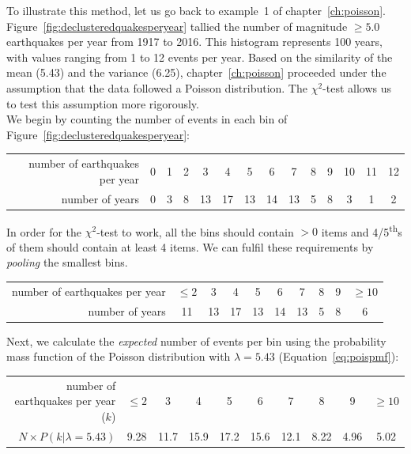 To illustrate this method, let us go back to example~1 of
chapter~\ref{ch:poisson}. Figure~\ref{fig:declusteredquakesperyear}
tallied the number of magnitude $\geq{5.0}$ earthquakes per year from
1917 to 2016.  This histogram represents 100 years, with values
ranging from 1 to 12 events per year. Based on the similarity of the
mean (5.43) and the variance (6.25), chapter~\ref{ch:poisson}
proceeded under the assumption that the data followed a Poisson
distribution.  The $\chi^2$-test allows us to test this assumption
more rigorously.\\

We begin by counting the number of events in each bin of
Figure~\ref{fig:declusteredquakesperyear}:

\begin{center}
  \begin{tabular}{r|c@{\gap}c@{\gap}c@{\gap}c@{\gap}c@{\gap}
      c@{\gap}c@{\gap}c@{\gap}c@{\gap}c@{\gap}c@{\gap}c@{\gap}c}
    number of earthquakes per year &
    0 & 1 & 2 & 3 & 4 & 5 & 6 & 7 & 8 & 9 & 10 & 11 & 12 \\
    number of years &
    0 & 3 & 8 & 13 & 17 & 13 & 14 & 13 & 5 & 8 & 3 & 1 & 2 
  \end{tabular}
\end{center}

In order for the $\chi^2$-test to work, all the bins should contain
$>0$ items and 4/5\textsuperscript{th}s of them should contain at
least 4 items. We can fulfil these requirements by \emph{pooling} the
smallest bins.

\begin{center}
  \begin{tabular}{r|c@{\gap}c@{\gap}c@{\gap}
      c@{\gap}c@{\gap}c@{\gap}c@{\gap}c@{\gap}c}
    number of earthquakes per year &
    $\leq{2}$ & 3 & 4 & 5 & 6 & 7 & 8 & 9 & $\geq{10}$ \\
    number of years &
    11 & 13 & 17 & 13 & 14 & 13 & 5 & 8 & 6
  \end{tabular}
\end{center}

Next, we calculate the \textit{expected} number of events per bin
using the probability mass function of the Poisson distribution with
$\lambda=5.43$ (Equation~\ref{eq:poispmf}):

\begin{center}
  \begin{tabular}{r|c@{\gap}c@{\gap}c@{\gap}
      c@{\gap}c@{\gap}c@{\gap}c@{\gap}c@{\gap}c}
    number of earthquakes per year ($k$) &
    $\leq{2}$ & 3 & 4 & 5 & 6 & 7 & 8 & 9 & $\geq{10}$ \\
    $N\times{P}(k|\lambda=5.43)$ & 9.28 & 11.7 & 15.9 & 17.2 &
    15.6 & 12.1 & 8.22 & 4.96 & 5.02
  \end{tabular}
\end{center}

